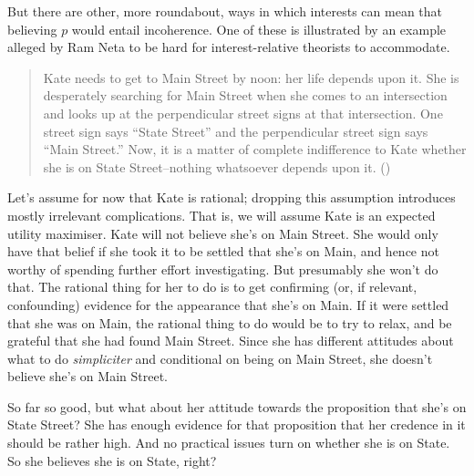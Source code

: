 \documentclass[
  11pt,
  letterpaper,
  DIV=11,
  numbers=noendperiod,
  oneside]{scrartcl}
\begin{document}
But there are other, more roundabout, ways in which interests can mean
that believing \(p\) would entail incoherence. One of these is
illustrated by an example alleged by Ram Neta to be hard for
interest-relative theorists to accommodate.

\begin{quote}
Kate needs to get to Main Street by noon: her life depends upon it. She
is desperately searching for Main Street when she comes to an
intersection and looks up at the perpendicular street signs at that
intersection. One street sign says ``State Street'' and the
perpendicular street sign says ``Main Street.'' Now, it is a matter of
complete indifference to Kate whether she is on State Street--nothing
whatsoever depends upon it. ()
\end{quote}

Let's assume for now that Kate is rational; dropping this assumption
introduces mostly irrelevant complications. That is, we will assume Kate
is an expected utility maximiser. Kate will not believe she's on Main
Street. She would only have that belief if she took it to be settled
that she's on Main, and hence not worthy of spending further effort
investigating. But presumably she won't do that. The rational thing for
her to do is to get confirming (or, if relevant, confounding) evidence
for the appearance that she's on Main. If it were settled that she was
on Main, the rational thing to do would be to try to relax, and be
grateful that she had found Main Street. Since she has different
attitudes about what to do \emph{simpliciter} and conditional on being
on Main Street, she doesn't believe she's on Main Street.

So far so good, but what about her attitude towards the proposition that
she's on State Street? She has enough evidence for that proposition that
her credence in it should be rather high. And no practical issues turn
on whether she is on State. So she believes she is on State, right?
\end{document}
